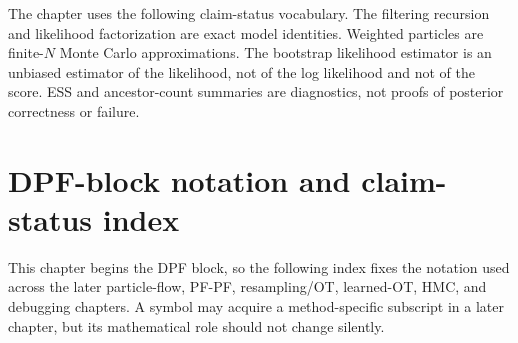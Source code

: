The chapter uses the following claim-status vocabulary.  The filtering
recursion and likelihood factorization are exact model identities.  Weighted
particles are finite-$N$ Monte Carlo approximations.  The bootstrap likelihood
estimator is an unbiased estimator of the likelihood, not of the log likelihood
and not of the score.  ESS and ancestor-count summaries are diagnostics, not
proofs of posterior correctness or failure.

\section{DPF-block notation and claim-status index}
\label{sec:bf-dpf-block-notation-index}

This chapter begins the DPF block, so the following index fixes the notation
used across the later particle-flow, PF-PF, resampling/OT, learned-OT, HMC, and
debugging chapters.  A symbol may acquire a method-specific subscript in a
later chapter, but its mathematical role should not change silently.

